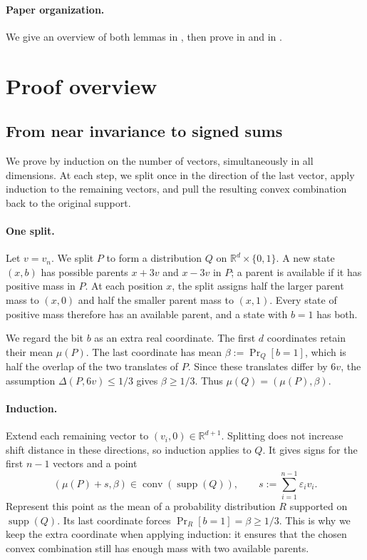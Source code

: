 \documentclass{article}
\newcommand{\R}{\mathbb{R}}
\newcommand{\eps}{\varepsilon}
\newcommand{\SDS}[2]{\Delta(#1,#2)}
\newcommand{\supp}{\operatorname{supp}}
\begin{document}
\paragraph{Paper organization.}
We give an overview of both lemmas in , then prove
 in  and
 in .

\section{Proof overview}
\label{sec:overview}

\subsection{From near invariance to signed sums}

We prove  by induction on the number of
vectors, simultaneously in all dimensions. At each step, we split
once in the direction of the last vector, apply induction to the
remaining vectors, and pull the resulting convex combination back
to the original support.

\paragraph{One split.}
Let $v=v_n$. We split $P$ to form a distribution $Q$ on
$\R^d\times\{0,1\}$. A new state $(x,b)$ has possible parents
$x+3v$ and $x-3v$ in $P$; a parent is available if it has positive
mass in $P$. At each position $x$, the split assigns half the
larger parent mass to $(x,0)$ and half the smaller parent mass to
$(x,1)$. Every state of positive mass therefore has an available
parent, and a state with $b=1$ has both.

We regard the bit $b$ as an extra real coordinate. The first $d$
coordinates retain their mean $\mu(P)$. The last coordinate has
mean $\beta:=\Pr_Q[b=1]$, which is half the overlap of the two
translates of $P$. Since these translates differ by $6v$, the
assumption $\SDS{P}{6v}\le1/3$ gives $\beta\ge1/3$.
Thus $\mu(Q)=(\mu(P),\beta)$.

\paragraph{Induction.}
Extend each remaining vector to $(v_i,0)\in\R^{d+1}$.
Splitting does not increase shift distance in these directions,
so induction applies to $Q$. It gives signs for the first $n-1$
vectors and a point
\[
(\mu(P)+s,\beta)\in\operatorname{conv}(\supp(Q)),
\qquad
s:=\sum_{i=1}^{n-1}\eps_i v_i.
\]
Represent this point as the mean of a probability distribution $R$
supported on $\supp(Q)$. Its last coordinate forces
$\Pr_R[b=1]=\beta\ge1/3$. This is why we keep the extra
coordinate when applying induction: it ensures that the chosen
convex combination still has enough mass with two available parents.
\end{document}

